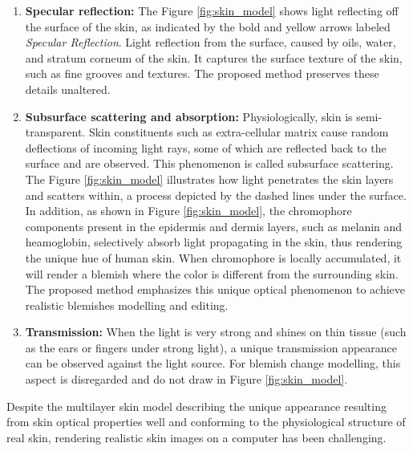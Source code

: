 \begin{spacing}{1.5}
\begin{enumerate}
    \item \textbf{Specular reflection:} The Figure \ref{fig:skin_model} shows light reflecting off the surface of the skin, as indicated by the bold and yellow arrows labeled \textit{Specular Reflection}. Light reflection from the surface, caused by oils, water, and stratum corneum of the skin. It captures the surface texture of the skin, such as fine grooves and textures. The proposed method preserves these details unaltered.
    \item \textbf{Subsurface scattering and absorption:} Physiologically, skin is semi-transparent\cite{Igarashi2005TheAO}. Skin constituents such as extra-cellular matrix cause random deflections of incoming light rays, some of which are reflected back to the surface and are observed. This phenomenon is called subsurface scattering. The Figure \ref{fig:skin_model} illustrates how light penetrates the skin layers and scatters within, a process depicted by the dashed lines under the surface. In addition, as shown in Figure \ref{fig:skin_model}, the chromophore components present in the epidermis and dermis layers, such as melanin and heamoglobin, selectively absorb light propagating in the skin, thus rendering the unique hue of human skin. When chromophore is locally accumulated, it will render a blemish where the color is different from the surrounding skin\cite{ANDERSON198113}. The proposed method emphasizes this unique optical phenomenon to achieve realistic blemishes modelling and editing.
    \item \textbf{Transmission:} When the light is very strong and shines on thin tissue (such as the ears or fingers under strong light), a unique transmission appearance can be observed against the light source. For blemish change modelling, this aspect is disregarded and do not draw in Figure \ref{fig:skin_model}.
\end{enumerate}

Despite the multilayer skin model describing the unique appearance resulting from skin optical properties well and conforming to the physiological structure of real skin, rendering realistic skin images on a computer has been challenging. 


\end{spacing}
